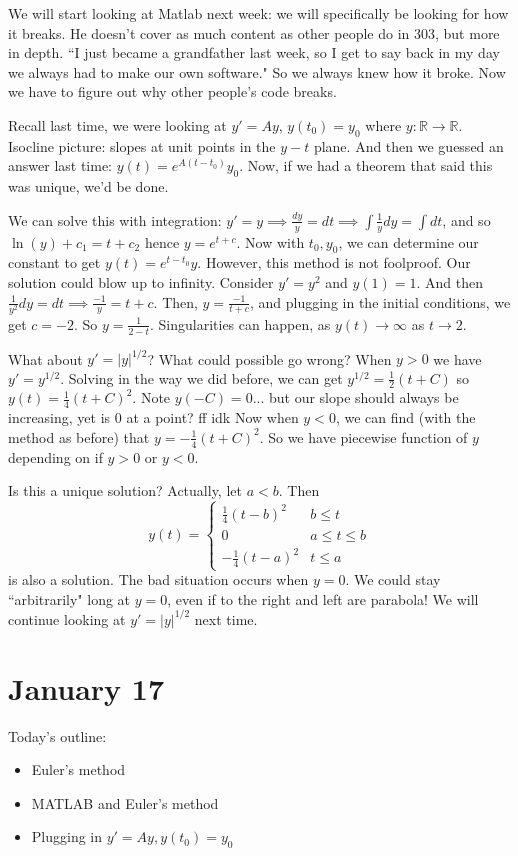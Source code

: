 \documentclass{article}
\theoremstyle{plain}
\theoremstyle{remark}
\newcommand{\R}{{\mathbb R}}
\begin{document}
We will start looking at Matlab next week: we will specifically be looking for how it breaks.
He doesn't cover as much content as other people do in 303, but more in depth.
``I just became a grandfather last week, so I get to say back in my day
we always had to make our own software."
So we always knew how it broke.
Now we have to figure out why other people's code breaks.

Recall last time, we were looking at $y' = Ay$, $y(t_0) = y_0$
where $y \colon \R \to \R$.
Isocline picture: slopes at unit points in the $y-t$ plane.
And then we guessed an answer last time: $y(t) = e^{A(t-t_0)}y_0$.
Now, if we had a theorem that said this was unique, we'd be done.

We can solve this with integration:
$y' = y \implies \frac{dy}{y} = dt \implies \int\frac{1}{y}dy = \int dt$,
and so $\ln(y) + c_1 = t + c_2$ hence $y = e^{t+c}$.
Now with $t_0,y_0$, we can determine our constant to get $y(t) = e^{t-t_0}y$.
However, this method is not foolproof.
Our solution could blow up to infinity.
Consider $y' = y^2$ and $y(1) = 1$.
And then $\frac{1}{y^2}dy = dt \implies \frac{-1}{y} = t+c$.
Then, $y= \frac{-1}{t+c}$, and plugging in the initial conditions, we get
$c = -2$.
So $y = \frac{1}{2-t}$.
Singularities can happen, as $y(t) \to \infty$ as $t \to 2$.

What about $y' = |y|^{1/2}$? What could possible go wrong?
When $y > 0$ we have $y' = y^{1/2}$.
Solving in the way we did before, we can get
$y^{1/2} = \frac12(t+C)$
so $y(t) = \frac{1}{4}(t+C)^2$.
Note $y(-C) = 0$... but our slope should always be increasing,
yet is $0$ at a point? ff idk
Now when $y < 0$, we can find (with the method as before)
that $y= -\frac14(t+C)^2$.
So we have piecewise function of $y$ depending on if $y > 0$ or $y < 0$.

Is this a unique solution?
Actually, let $a < b$. Then
\[
	y(t) = \begin{cases}
		\frac14(t-b)^2 & b \leq t\\
		0 & a \leq t \leq b\\
	-\frac14(t-a)^2 & t \leq a \end{cases}
\]
is also a solution.
The bad situation occurs when $y = 0$.
We could stay ``arbitrarily" long at $y = 0$,
even if to the right and left are parabola!
We will continue looking at $y' = |y|^{1/2}$ next time.

\section{January 17}
Today's outline:
\begin{itemize}
	\item Euler's method
	\item MATLAB and Euler's method
	\item Plugging in $y' = Ay, y(t_0) = y_0$
\end{itemize}
\end{document}
